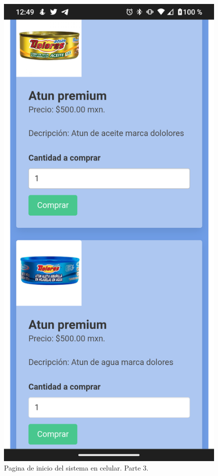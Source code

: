 \documentclass[11pt]{article}
\begin{document}
		\begin{figure}[H]
			\centering
			\includegraphics[scale=0.27]{resources/Screenshot_20211113-004956.png}
			\caption{Pagina de inicio del sistema en celular. Parte 3.}\label{fig:picture}
		\end{figure}
\end{document}
